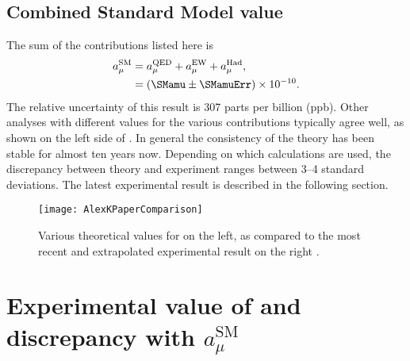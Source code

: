 \subsection{Combined Standard Model value}

The sum of the \amu contributions listed here is \cite{Kinoshita1,Kinoshita2,EW1,EW2,Keshavarzi:2018mgv,Nyffeler:2016gnb}
		\begin{equation}
		\begin{aligned}
            a_{\mu}^{\text{SM}} &= a_{\mu}^{\text{QED}} + a_{\mu}^{\text{EW}} + a_{\mu}^{\text{Had}}, \\
			&= (\SMamu \pm \SMamuErr) \times 10^{-10}.
		\end{aligned}
		\end{equation}
The relative uncertainty of this result is 307 parts per billion (ppb). Other analyses with different values for the various contributions typically agree well, as shown on the left side of . In general the consistency of the theory has been stable for almost ten years now. Depending on which calculations are used, the discrepancy between theory and experiment ranges between \SIrange{3}{4}{} standard deviations. The latest experimental result is described in the following section.

\begin{figure}[]
	\centering
	\texttt{[image: AlexKPaperComparison]}
	\caption[Comparison between theoretical and experimental values for \amu]{Various theoretical values for \amu on the left, as compared to the most recent and extrapolated experimental result on the right \cite{Keshavarzi:2018mgv}.}
	\label{fig:AlexKPaperComparison}
\end{figure}


\section{Experimental value of \amu and discrepancy with \texorpdfstring{$a_{\mu}^{\text{SM}}$}{amusm}}
\label{sec:Background}



